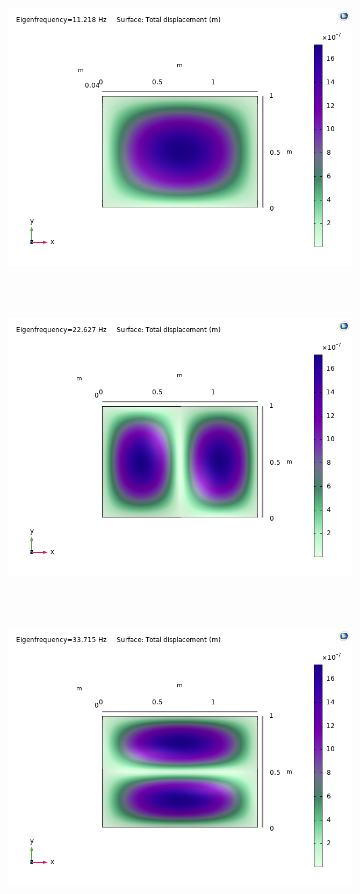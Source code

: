\documentclass[a4paper]{article}
\begin{document}
\begin{figure}[h]
	\centering
	\begin{subfigure}[b]{0.31\linewidth}
		\includegraphics[width=0.9\linewidth]{comsol/1ss.png}
	\end{subfigure}
	~
	\begin{subfigure}[b]{0.31\linewidth}
		\includegraphics[width=0.9\linewidth]{comsol/2ss.png}
	\end{subfigure}
	~
	\begin{subfigure}[b]{0.31\linewidth}
		\includegraphics[width=0.9\linewidth]{comsol/3ss.png}
	\end{subfigure}


\end{figure}
\end{document}
